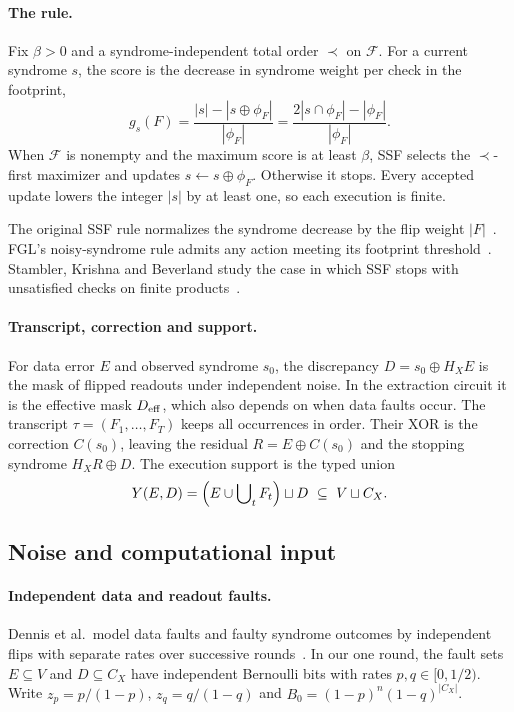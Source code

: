 \documentclass[10pt,twocolumn]{article}
\theoremstyle{definition}
\newcommand{\FF}{\mathcal{F}}
\begin{document}
\paragraph{The rule.} Fix $\beta>0$ and a syndrome-independent total order $\prec$ on $\FF$. For a current syndrome $s$, the score is the decrease in syndrome weight per check in the footprint,
\begin{equation}\label{eq:score}
 g_s(F)=\frac{|s|-|s\oplus\phi_F|}{|\phi_F|}
       =\frac{2|s\cap\phi_F|-|\phi_F|}{|\phi_F|}.
\end{equation}
When $\FF$ is nonempty and the maximum score is at least $\beta$, SSF selects the $\prec$-first maximizer and updates $s\leftarrow s\oplus\phi_F$. Otherwise it stops. Every accepted update lowers the integer $|s|$ by at least one, so each execution is finite.

The original SSF rule normalizes the syndrome decrease by the flip
weight $|F|$~\cite[Sec.~3]{LTZ15}. FGL's noisy-syndrome rule admits any
action meeting its footprint threshold~\cite[Alg.~2]{FGL18}.
Stambler, Krishna and Beverland study the case in which
SSF stops with unsatisfied checks on finite products~\cite{SKB23}.

\paragraph{Transcript, correction and support.}
For data error $E$ and observed syndrome $s_0$, the discrepancy
$D=s_0\oplus H_XE$ is the mask of flipped readouts under independent
noise. In the extraction circuit it is the effective mask $D_{\rm eff}$,
which also depends on when data faults occur. The transcript
$\tau=(F_1,\dots,F_T)$ keeps all occurrences in order. Their XOR is the
correction $C(s_0)$, leaving the residual $R=E\oplus C(s_0)$ and the
stopping syndrome $H_XR\oplus D$. The execution support is the typed union
\begin{equation}\label{eq:support}
Y(E,D)=\Bigl(E\cup\bigcup\nolimits_{t}F_t\Bigr)\sqcup D\ \subseteq\ V\sqcup C_X .
\end{equation}

\subsection{Noise and computational input}

\paragraph{Independent data and readout faults.} Dennis et al.\ model
data faults and faulty syndrome outcomes by independent flips with
separate rates over successive rounds~\cite{DKLP02}. In our one round,
the fault sets $E\subseteq V$ and $D\subseteq C_X$ have independent
Bernoulli bits with rates $p,q\in[0,1/2)$. Write $z_p=p/(1-p)$, $z_q=q/(1-q)$ and $B_0=(1-p)^n(1-q)^{|C_X|}$.
\end{document}
